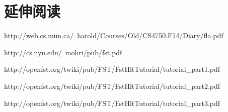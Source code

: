 \documentclass{article}
\begin{document}
\section{延伸阅读}
http://web.cs.mun.ca/~harold/Courses/Old/CS4750.F14/Diary/fla.pdf

http://cs.nyu.edu/~mohri/pub/fst.pdf

http://openfst.org/twiki/pub/FST/FstHltTutorial/tutorial_part1.pdf

http://openfst.org/twiki/pub/FST/FstHltTutorial/tutorial_part2.pdf

http://openfst.org/twiki/pub/FST/FstHltTutorial/tutorial_part3.pdf

\printbibliography
\end{document}
